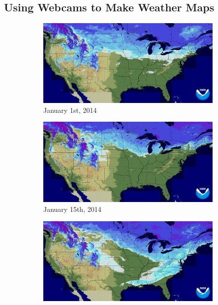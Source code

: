 \documentclass[10pt,twocolumn,letterpaper]{article}
\begin{document}
\subsection{Using Webcams to Make Weather Maps}

\begin{figure}
  \centering
  \begin{subfigure}[b]{0.33\textwidth}
    \centering
		\includegraphics[width=\textwidth, trim= 0mm 0mm 0mm 0mm]{figs/snow_gt_1.jpg}
    \caption{January 1st, 2014}
    \label{fig:snow_map_gt_1}
  \end{subfigure}
  \begin{subfigure}[b]{0.33\textwidth}
    \centering
		\includegraphics[width=\textwidth, trim= 0mm 0mm 0mm 0mm]{figs/snow_gt_2.jpg}
    \caption{January 15th, 2014}
    \label{fig:snow_map_gt_2}
  \end{subfigure}
  \begin{subfigure}[b]{0.33\textwidth}
    \centering
		\includegraphics[width=\textwidth, trim= 0mm 0mm 0mm 0mm]{figs/snow_gt_3.jpg}

\end{subfigure}
\end{figure}
\end{document}
